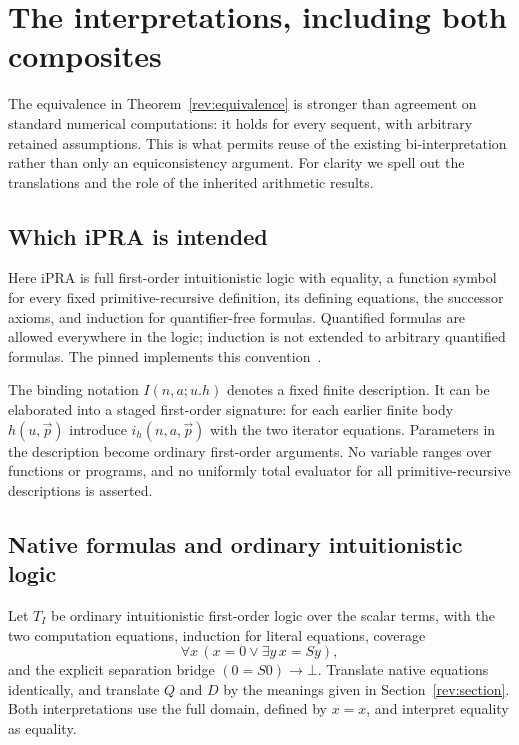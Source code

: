\section{The interpretations, including both composites}
\label{sec:interpretations}

The equivalence in Theorem~\ref{rev:equivalence} is stronger than agreement
on standard numerical computations: it holds for every sequent, with
arbitrary retained assumptions. This is what permits reuse of the
existing bi-interpretation rather than only an equiconsistency argument.
For clarity we spell out the translations and the role of the inherited
arithmetic results.

\subsection{Which iPRA is intended}

Here iPRA is full first-order intuitionistic logic with equality, a
function symbol for every fixed primitive-recursive definition, its
defining equations, the successor axioms, and induction for
quantifier-free formulas. Quantified formulas are allowed everywhere
in the logic; induction is not extended to arbitrary quantified formulas.
The pinned  implements this convention~\cite{leanbridge}.

The binding notation $I(n,a;u.h)$ denotes a fixed finite description.
It can be elaborated into a staged first-order signature: for each
earlier finite body $h(u,\vec p)$ introduce $i_h(n,a,\vec p)$ with
the two iterator equations. Parameters in the description become
ordinary first-order arguments. No variable ranges over functions or
programs, and no uniformly total evaluator for all primitive-recursive
descriptions is asserted.

\subsection{Native formulas and ordinary intuitionistic logic}

Let $T_I$ be ordinary intuitionistic first-order logic over the scalar
terms, with the two computation equations, induction for literal
equations, coverage
\[
  \forall x\,(x=0\vee\exists y\,x=Sy),
\]
and the explicit separation bridge $(0=S0)\to\bot$. Translate native
equations identically, and translate $Q$ and $D$ by the meanings given
in Section~\ref{rev:section}. Both interpretations use the full domain,
defined by $x=x$, and interpret equality as equality.

